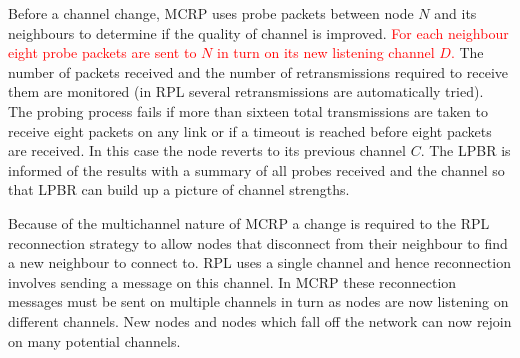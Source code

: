 Before a channel change, MCRP uses probe packets between node $N$ and its neighbours to determine if the quality of channel is improved.  \textcolor{red}{For each neighbour eight probe packets are sent to $N$ in turn on its new listening channel $D$.} The number of packets received and the number of retransmissions required to receive them are monitored (in RPL several retransmissions are automatically tried).  The probing process fails if more than sixteen total transmissions are taken to receive eight packets on any link or if a timeout is reached before eight packets are received. In this case the node reverts to its previous channel $C$.  The LPBR is informed of the results with a summary of all probes received and the channel so that LPBR can build up a picture of channel strengths.

Because of the multichannel nature of MCRP a change is required to the RPL reconnection strategy to allow nodes that disconnect from their neighbour to find a new neighbour to connect to. RPL uses a single channel and hence reconnection involves sending a message on this channel. In MCRP these reconnection messages must be sent on multiple channels in turn as nodes are now listening on different channels. New nodes and nodes which fall off the network can now rejoin on many potential channels.
